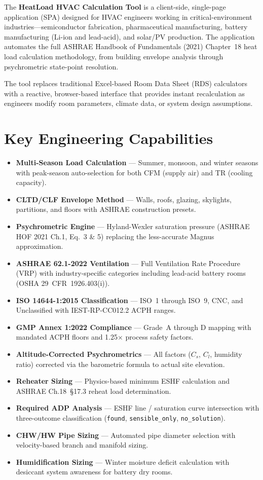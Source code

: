 \documentclass[12pt, a4paper, oneside]{report}
\newcommand{\code}[1]{\texttt{\textcolor{codered}{#1}}}
\newcommand{\ashrae}{\textsc{ASHRAE}}
\begin{document}
The \textbf{HeatLoad HVAC Calculation Tool} is a client-side, single-page application (SPA) designed for HVAC engineers working in critical-environment industries---semiconductor fabrication, pharmaceutical manufacturing, battery manufacturing (Li-ion and lead-acid), and solar/PV production. The application automates the full \ashrae{} Handbook of Fundamentals (2021) Chapter~18 heat load calculation methodology, from building envelope analysis through psychrometric state-point resolution.

The tool replaces traditional Excel-based Room Data Sheet (RDS) calculators with a reactive, browser-based interface that provides instant recalculation as engineers modify room parameters, climate data, or system design assumptions.

\section{Key Engineering Capabilities}

\begin{itemize}[leftmargin=1.5em]
  \item \textbf{Multi-Season Load Calculation} --- Summer, monsoon, and winter seasons with peak-season auto-selection for both CFM (supply air) and TR (cooling capacity).
  \item \textbf{CLTD/CLF Envelope Method} --- Walls, roofs, glazing, skylights, partitions, and floors with ASHRAE construction presets.
  \item \textbf{Psychrometric Engine} --- Hyland-Wexler saturation pressure (ASHRAE HOF 2021 Ch.1, Eq.~3 \& 5) replacing the less-accurate Magnus approximation.
  \item \textbf{ASHRAE 62.1-2022 Ventilation} --- Full Ventilation Rate Procedure (VRP) with industry-specific categories including lead-acid battery rooms (OSHA 29~CFR~1926.403(i)).
  \item \textbf{ISO 14644-1:2015 Classification} --- ISO~1 through ISO~9, CNC, and Unclassified with IEST-RP-CC012.2 ACPH ranges.
  \item \textbf{GMP Annex 1:2022 Compliance} --- Grade~A through D mapping with mandated ACPH floors and 1.25$\times$ process safety factors.
  \item \textbf{Altitude-Corrected Psychrometrics} --- All factors ($C_s$, $C_l$, humidity ratio) corrected via the barometric formula to actual site elevation.
  \item \textbf{Reheater Sizing} --- Physics-based minimum ESHF calculation and ASHRAE Ch.18~\S17.3 reheat load determination.
  \item \textbf{Required ADP Analysis} --- ESHF line / saturation curve intersection with three-outcome classification (\code{found}, \code{sensible\_only}, \code{no\_solution}).
  \item \textbf{CHW/HW Pipe Sizing} --- Automated pipe diameter selection with velocity-based branch and manifold sizing.
  \item \textbf{Humidification Sizing} --- Winter moisture deficit calculation with desiccant system awareness for battery dry rooms.
\end{itemize}
\end{document}

